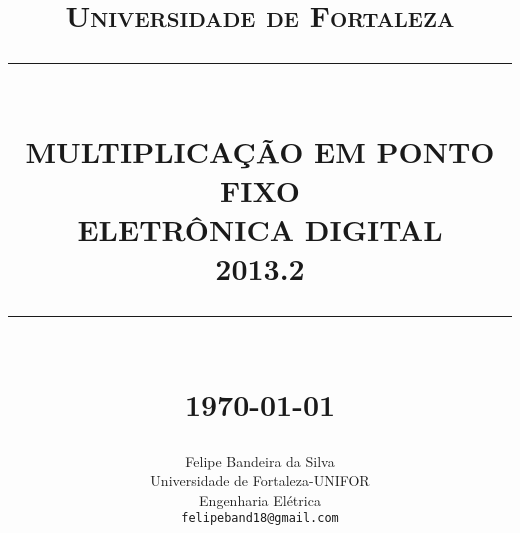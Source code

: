 %




\newcommand{\HRule}[1]{\rule{\linewidth}{#1}} 	%

\makeatletter							%
\def\printtitle{%
    {\centering \@title\par}}
\makeatother									

\makeatletter							%
\def\printauthor{%
    {\centering \large \@author}}				
\makeatother							

\title{	\normalsize \textsc{Universidade de Fortaleza} 	%
		 	\\[2.0cm]													%
			\HRule{0.5pt} \\										%
			\LARGE \textbf{\uppercase{Multiplicação em ponto fixo\\Eletrônica Digital\\2013.2}}	%
			\HRule{2pt} \\ [0.5cm]								%
			\normalsize \today									%
		}

\author{
		Felipe Bandeira da Silva\\	
		Universidade de Fortaleza-UNIFOR\\	
		Engenharia Elétrica\\
        \texttt{felipeband18@gmail.com} \\
}


